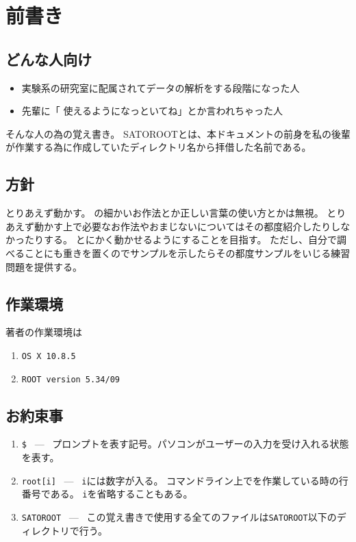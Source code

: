 \clearpage
\setcounter{section}{-1} %
 \section{前書き}


  \subsection{どんな人向け}
  \begin{itemize}
   \item 実験系の研究室に配属されてデータの解析をする段階になった人
   \item 先輩に「 \ROOT 使えるようになっといてね」とか言われちゃった人
  \end{itemize}
  そんな人の為の覚え書き。
  SATOROOTとは、本ドキュメントの前身を私の後輩が作業する為に作成していたディレクトリ名から拝借した名前である。


  \subsection{方針}
  とりあえず動かす。
  \Cpp の細かいお作法とか正しい言葉の使い方とかは無視。
  とりあえず動かす上で必要なお作法やおまじないについてはその都度紹介したりしなかったりする。
  とにかく動かせるようにすることを目指す。
  ただし、自分で調べることにも重きを置くのでサンプルを示したらその都度サンプルをいじる練習問題を提供する。


  \subsection{作業環境}
  著者の作業環境は
  \begin{enumerate}
   \item 
	 \verb|OS X 10.8.5|
   \item 
	 \verb|ROOT version 5.34/09|
  \end{enumerate}


  \subsection{お約束事}
  \begin{enumerate}
   \item \verb|$| \ --- \ プロンプトを表す記号。パソコンがユーザーの入力を受け入れる状態を表す。
   \item \verb|root[i]| \ --- \ \verb|i|には数字が入る。
	 コマンドライン上で\ROOT を作業している時の行番号である。
	 \verb|i|を省略することもある。
   \item \verb|SATOROOT| \ --- \ この覚え書きで使用する全てのファイルは\verb|SATOROOT|以下のディレクトリで行う。
  \end{enumerate}

